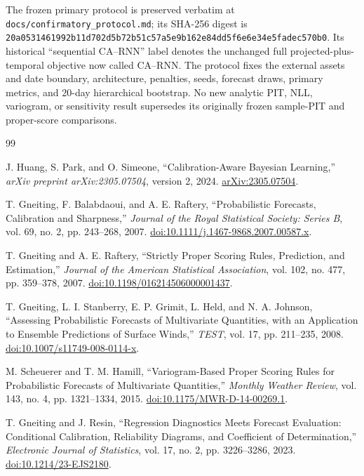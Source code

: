 \documentclass[11pt]{article}
\begin{document}
The frozen primary protocol is preserved verbatim at
\texttt{docs/confirmatory\_protocol.md}; its SHA-256 digest is
\nolinkurl{20a0531461992b11d702d5b72b51c57a5e9b162e84dd5f6e6e34e5fadec570b0}.
Its historical ``sequential CA--RNN'' label denotes the unchanged full
projected-plus-temporal objective now called CA--RNN. The protocol fixes the
external assets and date boundary, architecture, penalties, seeds, forecast
draws, primary metrics, and 20-day hierarchical bootstrap. No new analytic
PIT, NLL, variogram, or sensitivity result supersedes its originally frozen
sample-PIT and proper-score comparisons.

\begin{thebibliography}{99}

J. Huang, S. Park, and O. Simeone,
``Calibration-Aware Bayesian Learning,''
\emph{arXiv preprint arXiv:2305.07504}, version 2, 2024.
\href{https://arxiv.org/abs/2305.07504}{arXiv:2305.07504}.

T. Gneiting, F. Balabdaoui, and A. E. Raftery,
``Probabilistic Forecasts, Calibration and Sharpness,''
\emph{Journal of the Royal Statistical Society: Series B},
vol. 69, no. 2, pp. 243--268, 2007.
\href{https://doi.org/10.1111/j.1467-9868.2007.00587.x}{doi:10.1111/j.1467-9868.2007.00587.x}.

T. Gneiting and A. E. Raftery,
``Strictly Proper Scoring Rules, Prediction, and Estimation,''
\emph{Journal of the American Statistical Association},
vol. 102, no. 477, pp. 359--378, 2007.
\href{https://doi.org/10.1198/016214506000001437}{doi:10.1198/016214506000001437}.

T. Gneiting, L. I. Stanberry, E. P. Grimit, L. Held, and N. A. Johnson,
``Assessing Probabilistic Forecasts of Multivariate Quantities, with an
Application to Ensemble Predictions of Surface Winds,''
\emph{TEST}, vol. 17, pp. 211--235, 2008.
\href{https://doi.org/10.1007/s11749-008-0114-x}{doi:10.1007/s11749-008-0114-x}.

M. Scheuerer and T. M. Hamill,
``Variogram-Based Proper Scoring Rules for Probabilistic Forecasts of
Multivariate Quantities,''
\emph{Monthly Weather Review}, vol. 143, no. 4, pp. 1321--1334, 2015.
\href{https://doi.org/10.1175/MWR-D-14-00269.1}{doi:10.1175/MWR-D-14-00269.1}.

T. Gneiting and J. Resin,
``Regression Diagnostics Meets Forecast Evaluation: Conditional Calibration,
Reliability Diagrams, and Coefficient of Determination,''
\emph{Electronic Journal of Statistics}, vol. 17, no. 2,
pp. 3226--3286, 2023.
\href{https://doi.org/10.1214/23-EJS2180}{doi:10.1214/23-EJS2180}.


\end{thebibliography}
\end{document}
